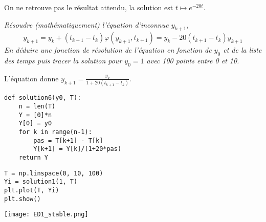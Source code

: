 On ne retrouve pas le résultat attendu, la solution est $t \mapsto e^{-20t}$.
\begin{Exercise}\it
Résoudre (mathématiquement) l'équation d'inconnue $y_{k+1}$,
\[y_{k+1} = y_k +(t_{k+1} - t_k)\varphi(y_{k+1}, t_{k+1}) = y_k -20(t_{k+1} - t_k)y_{k+1}\]
En déduire une fonction  de résolution de l'équation en fonction de $y_0$ et de la liste des temps puis tracer la solution pour $y_0 =1$ avec 100 points entre 0 et 10.
\end{Exercise}
\begin{Answer}
L'équation donne $\displaystyle y_{k+1} = \frac{y_k}{1+20(t_{k+1} - t_k)}$.

\smallskip

\begin{lstlisting}
def solution6(y0, T):
    n = len(T)
    Y = [0]*n
    Y[0] = y0
    for k in range(n-1):
        pas = T[k+1] - T[k]
        Y[k+1] = Y[k]/(1+20*pas)
    return Y
\end{lstlisting}

\begin{lstlisting}
T = np.linspace(0, 10, 100)
Yi = solution1(1, T)
plt.plot(T, Yi)
plt.show()
\end{lstlisting}

\begin{center}
\texttt{[image: ED1\_stable.png]}
\end{center}
\end{Answer}
